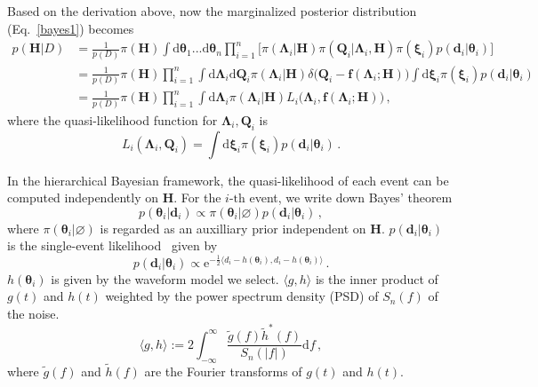 \documentclass[a4paper,11pt]{article}
\begin{document}
Based on the derivation above, now the marginalized posterior distribution (Eq.~\eqref{bayes1}) becomes
\begin{equation}
\label{hierarchical bayes}
\begin{aligned}
p(\bm{H}|D)&=\frac{1}{p(D)}\pi(\bm{H})\int \text{d}\bm{\theta}_1...\text{d}\bm{\theta}_n \prod_{i=1}^n \big[\pi(\bm{\Lambda}_i|\bm{H})\pi(\bm{Q}_i|\bm{\Lambda}_i,\bm{H})\pi(\bm{\xi}_i)p(\bm{d}_i|\bm{\theta}_i)\big] \\
&=\frac{1}{p(D)} \pi(\bm{H}) \prod_{i=1}^n
\int \text{d}\bm{\Lambda}_i\text{d}\bm{Q}_i\pi(\bm{\Lambda}_i|\bm{H})\delta\big(\bm{Q}_i-\bm{f}(\bm{\Lambda}_i;\bm{H})\big) \int \text{d}\bm{\xi}_i \pi(\bm{\xi}_i)p(\bm{d}_i|\bm{\theta}_i)\\
&=\frac{1}{p(D)} \pi(\bm{H}) \prod_{i=1}^n
\int \text{d}\bm{\Lambda}_i\pi(\bm{\Lambda}_i|\bm{H})L_i\big(\bm{\Lambda}_i,\bm{f}(\bm{\Lambda}_i;\bm{H})\big)\,,
\end{aligned}
\end{equation}
where the quasi-likelihood function for $\bm{\Lambda}_i,\bm{Q}_i$ is
\begin{equation}
\label{quasi-likelihood}
    L_i(\bm{\Lambda}_i,\bm{Q}_i)=\int \text{d}\bm{\xi}_i \pi(\bm{\xi}_i)p(\bm{d}_i|\bm{\theta}_i)\,.
\end{equation}


In the hierarchical Bayesian framework, the quasi-likelihood of each event can be computed independently on $\bm{H}$. For the $i\text{-th}$ event, we write down Bayes' theorem
\begin{equation}
\label{single bayes}
    p(\bm{\theta}_i|\bm{d}_i)\propto \pi(\bm{\theta}_i|\varnothing)p(\bm{d}_i|\bm{\theta}_i)\,,
\end{equation}
where $\pi(\bm{\theta}_i|\varnothing)$ is regarded as an auxilliary prior independent on $\bm{H}$. $p(\bm{d}_i|\bm{\theta}_i)$ is the single-event likelihood~\cite{Finn:1992wt} given by
\begin{equation}
p(\bm{d}_i|\bm{\theta}_i)\propto \mathrm{e}^{-\frac{1}{2}\langle d_i-h(\bm{\theta}_i),d_i-h(\bm{\theta}_i)\rangle}\,.
\end{equation}
$h(\bm{\theta}_i)$ is given by the waveform model we select. $\langle g, h\rangle$ is the inner product of $g(t)$ and $h(t)$ weighted by the power spectrum density (PSD) of $S_n(f)$ of the noise.
\begin{equation}
    \langle g, h\rangle:= 2\int_{-\infty}^{\infty}\frac{\tilde{g}(f)\tilde{h}^{*}(f)}{S_n(|f|)} \text{d}f\,,
\end{equation}
where $\tilde{g}(f)$ and $\tilde{h}(f)$ are the Fourier transforms of $g(t)$ and $h(t)$.
\end{document}
